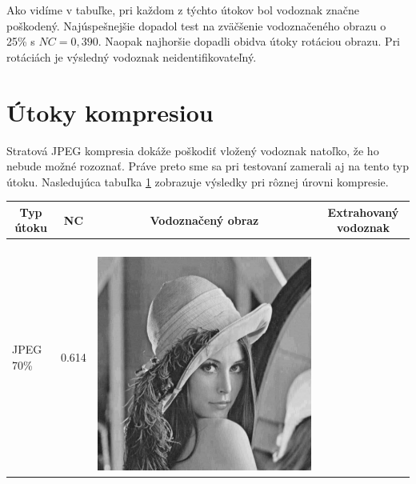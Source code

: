 Ako vidíme v tabuľke, pri každom z týchto útokov bol vodoznak značne poškodený. Najúspešnejšie dopadol test na zväčšenie vodoznačeného obrazu o 25\% s $NC=0,390$. Naopak najhoršie dopadli obidva útoky rotáciou obrazu. Pri rotáciách je výsledný vodoznak neidentifikovateľný.

\clearpage
\section{Útoky kompresiou} \label{compress}
Stratová JPEG kompresia dokáže poškodiť vložený vodoznak natoľko, že ho nebude možné rozoznať. Práve preto sme sa pri testovaní zamerali aj na tento typ útoku. Nasledujúca tabuľka \ref{compress-table} zobrazuje výsledky pri rôznej úrovni kompresie.
\begin{table}[h]
\centering
\label{compress-table}
\begin{tabular}{llcc}
\hline
\multicolumn{1}{c}{\textbf{Typ útoku}} & \multicolumn{1}{c}{\textbf{NC}} & \multicolumn{1}{c}{\textbf{Vodoznačený obraz}} & \multicolumn{1}{c}{\textbf{Extrahovaný vodoznak}} \\ \hline
JPEG 70\%                       & 0.614 &
\begin{minipage}[c]{.1\textwidth}
\ 
  \includegraphics[scale=0.1]{obrazky/jpeg70}
\end{minipage} &

\end{tabular}
\end{table}
